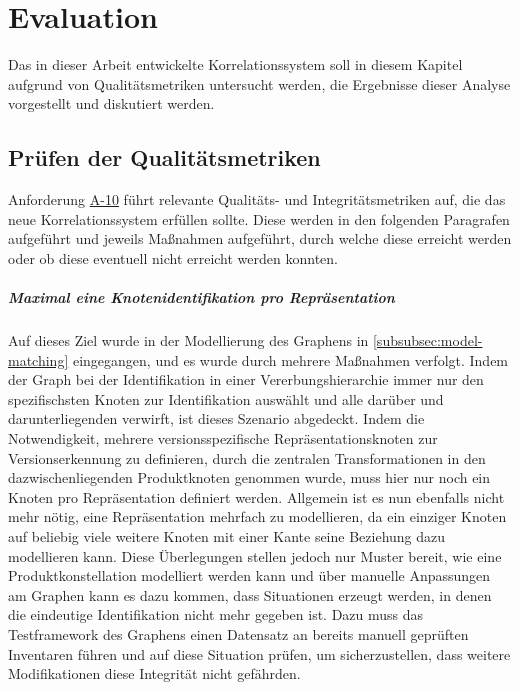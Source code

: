 \chapter{Evaluation}\label{ch:evaluation}

Das in dieser Arbeit entwickelte Korrelationssystem soll in diesem Kapitel aufgrund von Qualitätsmetriken untersucht werden, die Ergebnisse dieser Analyse vorgestellt und diskutiert werden.


\section{Prüfen der Qualitätsmetriken}

Anforderung \hyperref[subsec:req-graph-inner-consistency]{A-10} führt relevante Qualitäts- und Integritätsmetriken auf, die das neue Korrelationssystem erfüllen sollte.
Diese werden in den folgenden Paragrafen aufgeführt und jeweils Maßnahmen aufgeführt, durch welche diese erreicht werden oder ob diese eventuell nicht erreicht werden konnten.

\paragraph{Maximal eine Knotenidentifikation pro Repräsentation}
Auf dieses Ziel wurde in der Modellierung des Graphens in \autoref{subsubsec:model-matching} eingegangen, und es wurde durch mehrere Maßnahmen verfolgt.
Indem der Graph bei der Identifikation in einer Vererbungshierarchie immer nur den spezifischsten Knoten zur Identifikation auswählt und alle darüber und darunterliegenden verwirft, ist dieses Szenario abgedeckt.
Indem die Notwendigkeit, mehrere versionsspezifische Repräsentationsknoten zur Versionserkennung zu definieren, durch die zentralen Transformationen in den dazwischenliegenden Produktknoten genommen wurde, muss hier nur noch ein Knoten pro Repräsentation definiert werden.
Allgemein ist es nun ebenfalls nicht mehr nötig, eine Repräsentation mehrfach zu modellieren, da ein einziger Knoten auf beliebig viele weitere Knoten mit einer Kante seine Beziehung dazu modellieren kann.
Diese Überlegungen stellen jedoch nur Muster bereit, wie eine Produktkonstellation modelliert werden kann und über manuelle Anpassungen am Graphen kann es dazu kommen, dass Situationen erzeugt werden, in denen die eindeutige Identifikation nicht mehr gegeben ist.
Dazu muss das Testframework des Graphens einen Datensatz an bereits manuell geprüften Inventaren führen und auf diese Situation prüfen, um sicherzustellen, dass weitere Modifikationen diese Integrität nicht gefährden.

